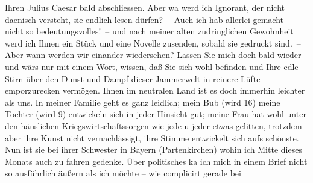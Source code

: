                Ihren Julius Caesar bald abschliessen. Aber wa{\geminationn} werd ich Ignorant, der
               nicht daenisch versteht, sie endlich lesen dürfen? – Auch ich hab allerlei gemacht –
               nicht so bedeutungsvolles! – und nach meiner alten zudringlichen Gewohnheit werd ich
               Ihnen ein Stück und eine Novelle zusenden, sobald sie
               gedruckt sind. – Aber wann werden wir einander wiedersehen? Lassen Sie mich doch bald
               wieder – und wärs nur mit einem Wort, wissen, daß Sie sich wohl befinden und Ihre
               edle Stirn über den Dunst und Dampf dieser Jammerwelt in {\pb}reinere Lüfte emporzurecken vermögen. Ihnen im
               neutralen Land ist es doch
               immerhin leichter als uns. In meiner Familie geht es ganz leidlich; mein Bub (wird 16) meine Tochter (wird 9) entwickeln
               sich in jeder Hinsicht gut; meine Frau hat wohl unter den häuslichen Kriegswirtschaftssorgen wie jede u jeder
               etwas gelitten, trotzdem aber ihre Kunst nicht vernachlässigt, ihre Stimme entwickelt
               sich aufs schönste. Nun ist sie bei ihrer Schwester in Bayern
                  (Partenkirchen) wohin ich Mitte dieses Monats
               auch zu fahren gedenke. Über politisches ka{\geminationn} ich mich in
               einem Brief nicht so ausführlich äußern als ich möchte – wie complicirt gerade bei
